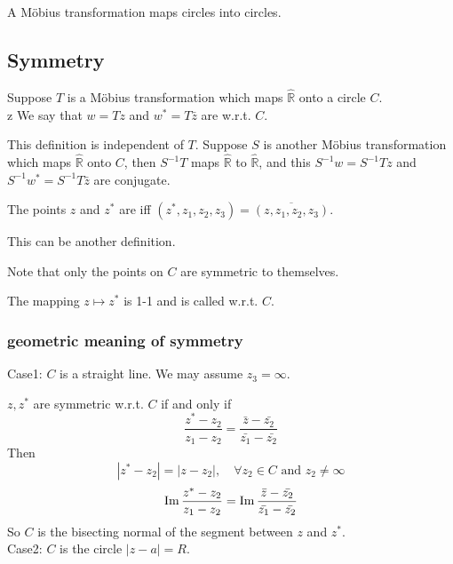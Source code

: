 \begin{theorem}
    A M{\"o}bius transformation maps circles into circles.
\end{theorem}
\subsection{Symmetry}
Suppose  $ T  $ is a M{\"o}bius transformation which maps  $ \hat{\mathbb{R}}  $ onto a circle  $ C $. \\z
We say that  $ w=Tz  $ and  $ w^*=T\bar{z} $ are  w.r.t.  $ C $.
\begin{remark}
    This definition is independent of  $ T $. Suppose  $ S  $ is another M{\"o}bius transformation which maps  $ \hat{\mathbb{R}} $ onto  $ C $, then  $ S^{-1}T $ maps  $ \hat{\mathbb{R}} $ to  $ \hat{\mathbb{R}} $, and this  $ S^{-1}w=S^{-1}Tz $ and  $ S^{-1}w^*=S^{-1}T\bar{z} $ are conjugate.       
\end{remark}  
The points  $ z  $ and  $ z^* $ are  iff  $ (z^*,z_1,z_2,z_3)=\overline{(z,z_1,z_2,z_3)} $.

This can be another definition. 

Note that only the points on  $ C  $ are symmetric to themselves.

The mapping  $ z\mapsto z^* $ is 1-1 and is called  w.r.t. $ C $.

\subsubsection{geometric meaning of symmetry} 
Case1:  $ C  $ is a straight line. We may assume  $ z_3=\infty $. 

 $ z,z^* $ are symmetric w.r.t.  $ C $ if and only if 
 \[\frac{z^*-z_2}{z_1-z_2}=\frac{\bar{z}-\bar{z_2}}{\bar{z_1}-\bar{z_2}}\]
 Then 
 \[|z^*-z_2|=|z-z_2|,\quad \forall z_2\in C\text{ and }z_2\not=\infty\]
 \[\operatorname{Im}\frac{z^*-z_2}{z_1-z_2}=\operatorname{Im}\frac{\bar{z}-\bar{z_2}}{\bar{z_1}-\bar{z_2}}\]   
 So  $ C  $ is the bisecting normal of the segment between  $ z  $ and  $ z^
 * $.\\
 Case2: $ C  $ is the circle  $ |z-a|=R $.
 
